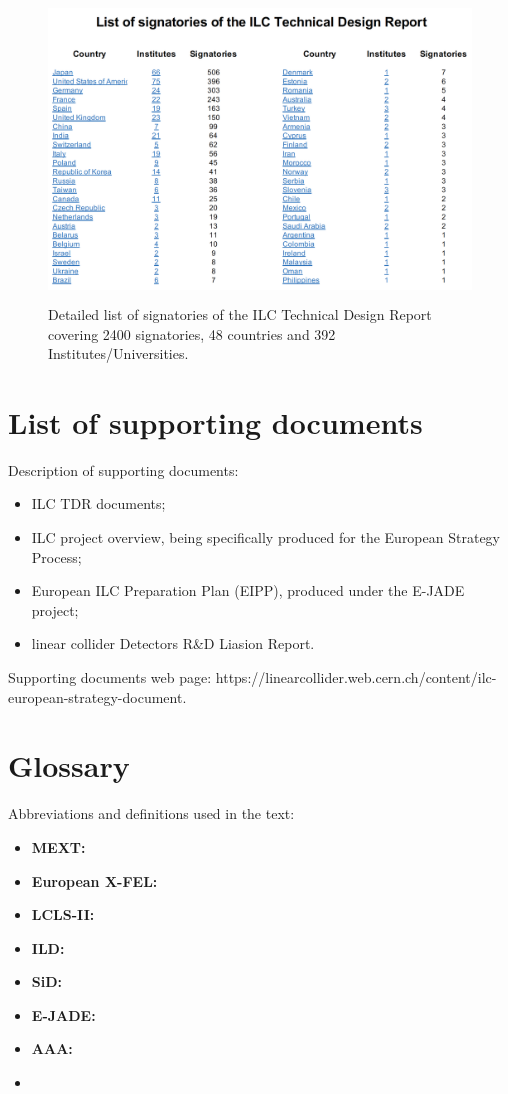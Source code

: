\documentclass[%
 reprint,
 amsmath,amssymb,
 aps,
]{revtex4-1}
\begin{document}
 \begin{figure}[h]
 \begin{center}
 \includegraphics[width=\hsize,height=8cm]{figures/CountriesInstitutes.png}
\caption{Detailed list of signatories of the ILC Technical Design Report covering 2400 signatories, 48 countries and 392 Institutes/Universities. \label{TDRsignatories}}
 \end{center}
 \end{figure}

\newpage

\section{\label{Appendix3} List of supporting documents} 
Description of supporting documents:
\begin{itemize}
\item
ILC TDR documents;
\item
ILC project overview, being specifically produced for the European Strategy Process;
\item
European ILC Preparation Plan (EIPP), produced under the E-JADE project;
\item
linear collider Detectors R&D Liasion Report.

\end{itemize}

Supporting documents web page: https://linearcollider.web.cern.ch/content/ilc-european-strategy-document.

\section{\label{Appendix4} Glossary} 
Abbreviations and definitions used in the text:
\begin{itemize}
\item
\textbf{MEXT:}
\item
\textbf{European X-FEL:}
\item
\textbf{LCLS-II:}
\item
\textbf{ILD:}
\item
\textbf{SiD:}
\item
\textbf{E-JADE:}
\item
\textbf{AAA:}
\item
\textbf{}
\end{itemize}
\end{document}
